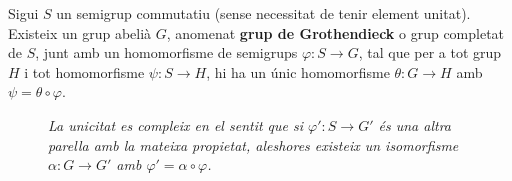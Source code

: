 \begin{theorem} \label{GG} Sigui $S$ un semigrup commutatiu (sense necessitat de tenir element unitat). Existeix un grup abelià $G$, anomenat \textbf{grup de Grothendieck} o grup completat de $S$, junt amb un homomorfisme de semigrups $\varphi: S \rightarrow G$, tal que per a tot grup $H$ i tot homomorfisme $\psi : S \rightarrow H$, hi ha un únic homomorfisme $\theta: G\rightarrow H$ amb $\psi = \theta \circ \varphi$.




\begin{figure}[!htb]
\begin{flushright}
\end{flushright}
\endminipage\hfill
{}
\textit{La unicitat es compleix en el sentit que si $\varphi ': S\rightarrow G'$ és una altra parella amb la mateixa propietat, aleshores existeix un isomorfisme $\alpha: G \rightarrow G'$ amb $\varphi ' = \alpha \circ \varphi$.}


\endminipage\hfill
{}%
\endminipage
\end{figure}
\end{theorem}

